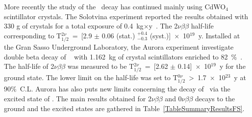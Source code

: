 \documentclass[main.tex]{subfiles}
\begin{document}
\bigskip


\NI More recently the study of the \Cd~decay has continued mainly using CdWO$_{\text{4}}$ scintillator crystals. The Solotvina experiment reported the results obtained with 330 g of crystals for a total exposure  of 0.4~kg$\times$y~\cite{Solotvina}. The 2$\nu\beta\beta$ half-life corresponding to T$_{\text{1}/\text{2}}^{\text{2}\nu}$~=~[2.9 $\pm$ 0.06 (stat.) $^{+\text{0.4}}_{-\text{0.3}}$ (syst.)]~$\times$~10$^{\text{19}}$~y. Installed at the Gran Sasso Underground Laboratory, the Aurora experiment investigate double beta decay of \Cd~ with 1.162~kg of crystal scintillators enriched to 82~\%~\cite{Aurora}. The half-life of 2$\nu\beta\beta$ was measured to be T$_{\text{1}/\text{2}}^{\text{2}\nu}$~=~[2.62 $\pm$ 0.14]~$\times$~10$^{\text{19}}$~y for the ground state. The lower limit on the half-life was set to T$_{\text{1}/\text{2}}^{\text{0}\nu}$~>~1.7~$\times$~10$^{\text{23}}$~y at 90\%~C.L. Aurora has also puts new limits concerning the decay of \Cd~via the excited state of \Sn. The main results obtained for 2$\nu\beta\beta$ and 0$\nu\beta\beta$ decays to the ground and the excited states are gathered in Table~\ref{TableSummaryResultsFS}.
\end{document}
